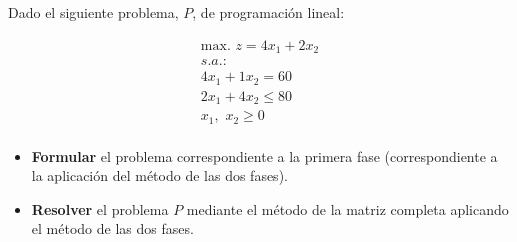 Dado el siguiente problema, $P$, de programación lineal:

\begin{equation}
\begin{split}
\mbox{max. } z = 4x_1 + 2x_2\\
s.a.:\\
4x_1 + 1x_2  = 60\\
2x_1 + 4x_2  \leq 80\\
x_1,\,\,x_2\geq 0\\
\end{split}
\end{equation}

\begin{itemize}
    \item \textbf{Formular} el problema correspondiente a la primera fase (correspondiente a la aplicación del método de las dos fases).
    \item \textbf{Resolver} el problema $P$ mediante el método de la matriz completa aplicando el método de las dos fases.
\end{itemize}
